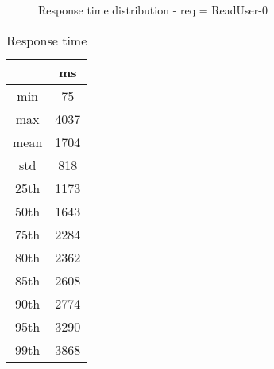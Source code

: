 \begin{minipage}{0.75\linewidth}
\begin{figure}[h]
\begin{adjustbox}{max width=1.0\linewidth, keepaspectratio}
  \end{adjustbox}
  \caption{Response time distribution - req = ReadUser-0}
\end{figure}
\end{minipage}\hfill\begin{minipage}{0.18\linewidth}
\begin{table}[h]
\begin{tabular}{|cc|}
\hline
\textbf{} & \textbf{ms}\\ \hline
 \Xhline{0.005\arrayrulewidth}
min & 75\\
 \Xhline{0.005\arrayrulewidth}
max & 4037\\
 \Xhline{0.005\arrayrulewidth}
mean & 1704\\
 \Xhline{0.005\arrayrulewidth}
std & 818\\
\hline
\hline
 \Xhline{0.005\arrayrulewidth}
25th & 1173\\
 \Xhline{0.005\arrayrulewidth}
50th & 1643\\
 \Xhline{0.005\arrayrulewidth}
75th & 2284\\
 \Xhline{0.005\arrayrulewidth}
80th & 2362\\
 \Xhline{0.005\arrayrulewidth}
85th & 2608\\
 \Xhline{0.005\arrayrulewidth}
90th & 2774\\
 \Xhline{0.005\arrayrulewidth}
95th & 3290\\
 \Xhline{0.005\arrayrulewidth}
99th & 3868\\
\hline
\end{tabular}
\caption{Response time}
\end{table}
\end{minipage}\hfill